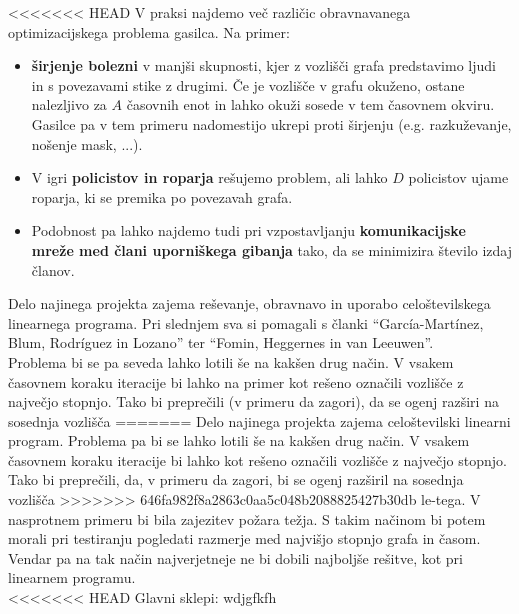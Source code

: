 \documentclass[a4paper, 12pt]{article}
\begin{document}
<<<<<<< HEAD
V praksi najdemo več različic obravnavanega optimizacijskega problema gasilca. Na primer:
\begin{itemize}
    \item\textbf{širjenje bolezni} v manjši skupnosti, kjer z vozlišči grafa predstavimo ljudi 
    in s povezavami stike z drugimi. Če je vozlišče v grafu okuženo, ostane nalezljivo 
    za $A$ časovnih enot in lahko okuži sosede v tem časovnem okviru. Gasilce pa v tem
    primeru nadomestijo ukrepi proti širjenju (e.g. razkuževanje, nošenje mask, ...).
    \item V igri \textbf{policistov in roparja} rešujemo problem, ali lahko $D$ policistov ujame roparja, ki se 
    premika po povezavah grafa. 
    \item Podobnost pa lahko najdemo tudi pri vzpostavljanju \textbf{komunikacijske mreže med člani uporniškega gibanja}
    tako, da se minimizira število izdaj članov.
\end{itemize}

\noindent Delo najinega projekta zajema reševanje, obravnavo in uporabo celoštevilskega linearnega programa. 
Pri slednjem sva si pomagali s članki ``García-Martínez, Blum, Rodríguez in Lozano''\cite{garcia2015} ter
``Fomin, Heggernes in van Leeuwen''\cite{fomin2015}. \\
Problema bi se pa seveda lahko lotili še
na kakšen drug način. V vsakem časovnem koraku iteracije bi lahko na primer kot rešeno označili vozlišče z 
največjo stopnjo. Tako bi preprečili (v primeru da zagori), da se ogenj razširi na sosednja vozlišča
=======
Delo najinega projekta zajema celoštevilski linearni program. Problema pa bi se lahko lotili še
na kakšen drug način. V vsakem časovnem koraku iteracije bi lahko kot rešeno označili vozlišče z 
največjo stopnjo. Tako bi preprečili, da, v primeru da zagori, bi se ogenj razširil na sosednja vozlišča
>>>>>>> 646fa982f8a2863c0aa5c048b2088825427b30db
le-tega. V nasprotnem primeru bi bila zajezitev požara težja. 
S takim načinom bi potem morali pri testiranju pogledati razmerje med najvišjo stopnjo 
grafa in časom. Vendar pa na tak način najverjetneje ne bi dobili najboljše
rešitve, kot pri linearnem programu. \\

<<<<<<< HEAD
\noindent Glavni sklepi: wdjgfkfh

\pagebreak
\end{document}
